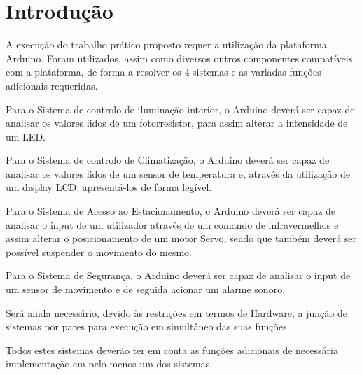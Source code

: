 \chapter*{Introdução}

A execução do trabalho prático proposto requer a utilização da plataforma Arduino. Foram utilizados, assim como diversos outros componentes compatíveis com a plataforma, de forma a resolver os 4 sistemas e as variadas funções adicionais requeridas.

Para o Sistema de controlo de iluminação interior, o Arduino deverá ser capaz de analisar os valores lidos de um fotorresistor, para assim alterar a intensidade de um LED.

Para o Sistema de controlo de Climatização, o Arduino deverá ser capaz de analisar os valores lidos de um sensor de temperatura e, através da utilização de um display LCD, apresentá-los de forma legível.

Para o Sistema de Acesso ao Estacionamento, o Arduino deverá ser capaz de analisar o input de um utilizador através de um comando de infravermelhos e assim alterar o posicionamento de um motor Servo, sendo que também deverá ser possível suspender o movimento do mesmo.

Para o Sistema de Segurança, o Arduino deverá ser capaz de analisar o input de um sensor de movimento e de seguida acionar um alarme sonoro.

Será ainda necessário, devido às restrições em termos de Hardware, a junção de sistemas por pares para execução em simultâneo das suas funções.

Todos estes sistemas deverão ter em conta as funções adicionais de necessária implementação em pelo menos um dos sistemas. 
